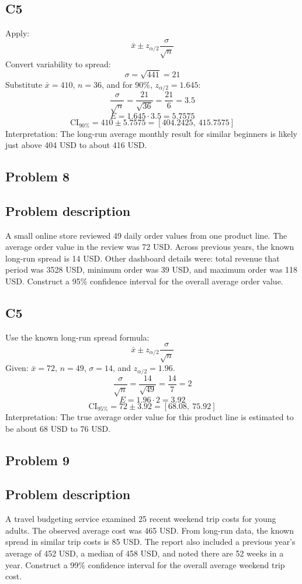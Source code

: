 \begin{ExamProblems}
		\subsection*{C5}
		Apply:
		\[
		\bar{x} \pm z_{\alpha/2}\frac{\sigma}{\sqrt{n}}
		\]
		Convert variability to spread:
		\[
		\sigma=\sqrt{441}=21
		\]
		Substitute $\bar{x}=410$, $n=36$, and for 90\%, $z_{\alpha/2}=1.645$:
		\[
		\frac{\sigma}{\sqrt{n}}=\frac{21}{\sqrt{36}}=\frac{21}{6}=3.5
		\]
		\[
		E=1.645\cdot 3.5=5.7575
		\]
		\[
		\text{CI}_{90\%}=410\pm 5.7575=[404.2425,\ 415.7575]
		\]
		Interpretation: The long-run average monthly result for similar beginners is likely just above 404 USD to about 416 USD.

		\newpage
		\item
		\subsection*{Problem 8}
		\subsection*{Problem description}
		A small online store reviewed 49 daily order values from one product line.
		The average order value in the review was 72 USD.
		Across previous years, the known long-run spread is 14 USD.
		Other dashboard details were: total revenue that period was 3528 USD, minimum order was 39 USD, and maximum order was 118 USD.
		Construct a 95\% confidence interval for the overall average order value.

		\subsection*{C5}
		Use the known long-run spread formula:
		\[
		\bar{x} \pm z_{\alpha/2}\frac{\sigma}{\sqrt{n}}
		\]
		Given: $\bar{x}=72$, $n=49$, $\sigma=14$, and $z_{\alpha/2}=1.96$.
		\[
		\frac{\sigma}{\sqrt{n}}=\frac{14}{\sqrt{49}}=\frac{14}{7}=2
		\]
		\[
		E=1.96\cdot 2=3.92
		\]
		\[
		\text{CI}_{95\%}=72\pm 3.92=[68.08,\ 75.92]
		\]
		Interpretation: The true average order value for this product line is estimated to be about 68 USD to 76 USD.

		\newpage
		\item
		\subsection*{Problem 9}
		\subsection*{Problem description}
		A travel budgeting service examined 25 recent weekend trip costs for young adults.
		The observed average cost was 465 USD.
		From long-run data, the known spread in similar trip costs is 85 USD.
		The report also included a previous year's average of 452 USD, a median of 458 USD, and noted there are 52 weeks in a year.
		Construct a 99\% confidence interval for the overall average weekend trip cost.


\end{ExamProblems}
